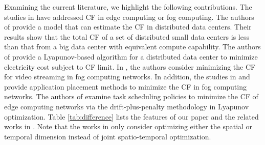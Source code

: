 \documentclass[conference, 10pt, ﬁnal, letterpaper, twocolumn]{IEEEtran}
\begin{document}
Examining the current literature, we highlight the following contributions. The studies in \cite{van2012distributed, Rad2022Carbon, do2015proximal, aldossary2021towards, ahvar2021deca, yang2022carbon} have addressed CF in edge computing or fog computing. The authors of \cite{van2012distributed} provide a model that can estimate the CF in distributed data centers. Their results show that the total CF of a set of distributed small data centers is less than that from a big data center with equivalent compute capability. The authors of \cite{Rad2022Carbon} provide a Lyapunov-based algorithm for a distributed data center to minimize electricity cost subject to CF limit. In \cite{do2015proximal}, the authors consider minimizing the CF for video streaming in fog computing networks. In addition, the studies in \cite{aldossary2021towards} and \cite{ahvar2021deca} provide application placement methods to minimize the CF in fog computing networks. The authors of \cite{yang2022carbon} examine task scheduling policies to minimize the CF of edge computing networks via the drift-plus-penalty methodology in Lyapunov optimization. Table \ref{tab:difference} lists the features of our paper and the related works in \cite{van2012distributed, Rad2022Carbon, do2015proximal, aldossary2021towards, ahvar2021deca, yang2022carbon}. Note that the works in \cite{van2012distributed, Rad2022Carbon, do2015proximal, aldossary2021towards, ahvar2021deca} only consider optimizing either the spatial or temporal dimension instead of joint spatio-temporal optimization. 
\end{document}
